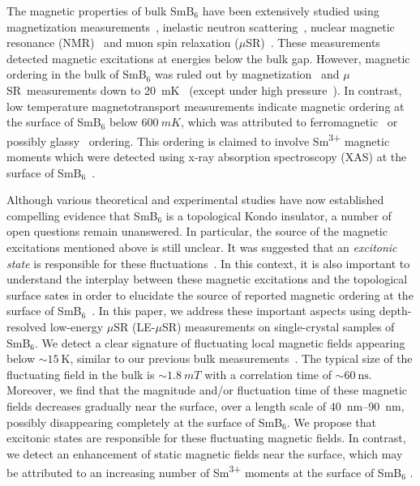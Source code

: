 \documentclass[10pt,aps,prb,twocolumn,showpacs,preprintnumbers,amsmath,amssymb,superscriptaddress,floatfix]{revtex4-1}
\newcommand{\msr}{$\mu$SR}
\newcommand{\lem}{LE-\msr}
\newcommand{\smb}{SmB$_6$}
\newcommand{\usim}{\sim \!}
\begin{document}
The magnetic properties of bulk \smb{} have been extensively studied
using magnetization measurements~\cite{Menth1969prl}, inelastic
neutron
scattering~\cite{Alekseev1993pb,Alekseev1995jpcm,Alekseev2010jetp,Fuhrman2015prl},
nuclear magnetic resonance
(NMR)~\cite{Takigawa1981jpsj,Caldwell2004,Caldwell2007prb,Schlottmann2014prb}
and muon spin relaxation (\msr)~\cite{Biswas2014prb}. These
measurements detected magnetic excitations at energies below the bulk
gap. However, magnetic ordering in the bulk of \smb{} was ruled out by
magnetization~\cite{Menth1969prl} and \msr\ measurements down to
\SI{20}{mK}~\cite{Biswas2014prb} (except under high
pressure~\cite{Barla2005prl}). In contrast, low temperature
magnetotransport measurements indicate magnetic ordering at the
surface of \smb{} below $\SI{600}{mK}$, which was attributed to
ferromagnetic~\cite{Nakajima2016np} or possibly
glassy~\cite{Wolgast2015prb} ordering. This ordering is claimed to
involve Sm\textsuperscript{3+} magnetic moments which were detected
using x-ray absorption spectroscopy (XAS) at the surface of
\smb{}~\cite{Phelan2014prx}.

Although various theoretical
\cite{Dzero2010prl,Alexandrov2013prl,Lu2013prl,Dzero2012prb} and
experimental
\cite{Wolgast2013prb,Kim2013sr,Zhang2013prx,Kim2014nm,Xu2013prb,Neupane2013nc,Jiang2013nc,Xu2014nc}
studies have now established compelling evidence that \smb{} is a
topological Kondo insulator, a number of open questions remain
unanswered. In particular, the source of the magnetic excitations
mentioned above is still unclear. It was suggested that an
\emph{excitonic state} is responsible for these
fluctuations~\cite{Riseborough2000adp, Alekseev2010jetp,
  Fuhrman2015prl,Knolle2016arxiv}. In this context, it is also
important to understand the interplay between these magnetic
excitations and the topological surface sates in order to elucidate
the source of reported magnetic ordering at the surface of
\smb{}~\cite{Nakajima2016np,Wolgast2015prb}. In this paper, we address
these important aspects using depth-resolved low-energy \msr{} (\lem)
measurements on single-crystal samples of \smb{}. We detect a clear
signature of fluctuating local magnetic fields appearing below
$\usim\SI{15}{\K}$, similar to our previous bulk
measurements~\cite{Biswas2014prb}. The typical size of the fluctuating
field in the bulk is $\usim \SI{1.8}{mT}$ with a correlation time of
$\usim \SI{60}{\ns}$. Moreover, we find that the magnitude and/or
fluctuation time of these magnetic fields decreases gradually near the
surface, over a length scale of \SIrange{40}{90}{\nm}, possibly
disappearing completely at the surface of \smb{}. We propose that
excitonic states are responsible for these fluctuating magnetic
fields. In contrast, we detect an enhancement of static magnetic
fields near the surface, which may be attributed to an increasing
number of Sm\textsuperscript{3+} moments at the surface of \smb{}
\cite{Phelan2014prx}.
\end{document}
